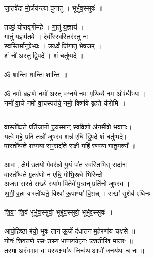 जा॒तवे॑दा मो॒र्जय॑न्त्या पुनातु । भूर्भुव॒स्सुवः॑ ॥\\
\\
तच्छं॒ योरावृ॑णीमहे । गा॒तुं य॒ज्ञाय॑ ।\\
गा॒तुं य॒ज्ञप॑तये । दैवी᳚स्स्व॒स्तिर॑स्तु नः । \\
स्व॒स्तिर्मानु॑षेभ्यः । ऊ॒र्ध्वं जि॑गातु भेष॒जम् ।\\
शं नो॑ अस्तु द्वि॒पदे᳚ । शं चतु॑ष्पदे ॥\\
\\
ॐ शान्तिः॒ शान्तिः॒ शान्तिः॑ ॥\\
\\
ॐ नमो॒ ब्रह्म॑णे॒ नमो॑ अस्त् व॒ग्नये॒ नमः॑ पृथि॒व्यै नम॒ ओष॑धीभ्यः ।\\
नमो॑ वा॒चे नमो॑ वा॒चस्पत॑ये॒ नमो॒ विष्ण॑वे बृह॒ते क॑रोमि ॥\\
\subsection{}
वास्तो᳚ष्पते॒ प्रति॑जानी ह्॒यस्मान्  स्वा॑वे॒शो अ॑नमी॒वो भवानः। \\
यत्वे महे॒॑ प्रति॒ तन्नो॑ जुषस्व॒ शन्न॑ एघि द्वि॒पदे॒ शं चतु॑ष्पदे। \\
वास्तो᳚ष्पते श॒ग्मया सꣳ॒सदा॑ते सक्षी॒ महि॑ र॒ण्वया॑ गातु॒मत्या᳚ ॥\\
\\
आवः॒ , क्षेम॑ उ॒तयो गे॒वर॑न्नो यू॒यं पा॑त स्व॒स्तिभि॒स् सदा॑नः \\
वास्तो᳚ष्पते प्र॒तर॑णो न एधि॒ गोभि॒रश्वे॑ भिरिन्दो ।\\
अ॒जरा॑ सस्ते सख्ये स्या॑म पि॒तेवे॑ पु॒त्रान् प्रति॑नो जुषस्व ।\\
अ॒मी॒ व॒हा वास्तो᳚ष्पते॒ विश्वा॑ रू॒पाण्या॑ वि॒शन्न् । सखा॑ सुशेव॑ एधिनः \\
\\
शि॒व॒ꣳ शि॒वं भूर्भुव॒स्सुवो॒ भूर्भुव॒स्सुवो॒ भूर्भुव॒स्सुवः॑ ॥\\
\\
आपो॒हिष्ठा म॑यो॒ भुवः ता॑न ऊ॒र्जे द॑धातन म॒हेरणा॑य चक्ष॑से ॥\\
योवः॑ शि॒वतमो॒ रसः तस्य॑ भाजयते॒हनः उश॒तीरिव मा॒तरः ॥\\
तस्मा॒ अरं॑गमाम वः यस्य॒क्षया॑य॒ जिन्व॑थ आपो॑ ज॒नय॑था च नः ॥\\

